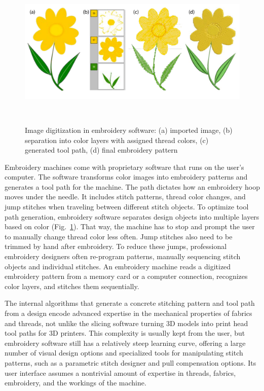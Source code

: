 \documentclass{sigchi}
\begin{document}
 \begin{figure}
\centering
  \includegraphics[width=0.9\columnwidth]{figures/EMWorkflow}
  \caption{Image digitization in embroidery software: (a) imported image, (b) separation into color layers with assigned thread colors, (c) generated tool path, (d) final embroidery pattern }~\label{fig:EmbroideryWorkflow}
  \vspace{-2.5em}
\end{figure}

Embroidery machines come with proprietary software that runs on the user's computer. The software transforms color images into embroidery patterns and generates a tool path for the machine. The path dictates how an embroidery hoop moves under the needle. It includes stitch patterns, thread color changes, and jump stitches when traveling between different stitch objects. To optimize tool path generation, embroidery software separates design objects into multiple layers based on color (Fig.\ \ref{fig:EmbroideryWorkflow}). That way, the machine has to stop and prompt the user to manually change thread color less often. Jump stitches also need to be trimmed by hand after embroidery. To reduce these jumps, professional embroidery designers often re-program patterns, manually sequencing stitch objects and individual stitches. 
An embroidery machine reads a digitized embroidery pattern from a memory card or a computer connection, recognizes color layers, and stitches them sequentially.


The internal algorithms that generate a concrete stitching pattern and tool path from a design encode advanced expertise in the mechanical properties of fabrics and threads, not unlike the slicing software turning 3D models into print head tool paths for 3D printers. This complexity is usually kept from the user, but embroidery software still has a relatively steep learning curve, offering a large number of visual design options and specialized tools for manipulating stitch patterns, such as a parametric stitch designer and pull compensation options.
Its user interface assumes a nontrivial amount of expertise in threads, fabrics, embroidery, and the workings of the machine.
\end{document}
